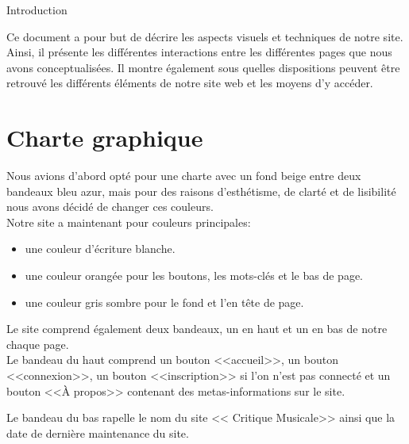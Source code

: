 
{Introduction}

	\begin{paragraphe}
		Ce document a pour but de décrire les aspects visuels et techniques de notre site.
		Ainsi, il présente les différentes interactions entre les différentes pages que nous avons conceptualisées.
		Il montre également sous quelles dispositions peuvent être retrouvé les différents éléments de notre site web et les moyens d'y accéder.
	\end{paragraphe}

\section{Charte graphique}

	\begin{paragraphe}
	    Nous avions d'abord opté pour une charte avec un fond beige entre deux bandeaux bleu azur, mais pour des raisons
	    d'esthétisme, de clarté et de lisibilité nous avons décidé de changer ces couleurs.\\

		Notre site a maintenant pour couleurs principales:
            \begin{itemize}
            \item une couleur d'écriture blanche.
            \item une couleur orangée pour les boutons, les mots-clés et le bas de page.
            \item une couleur gris sombre pour le fond et l'en tête de page.
            \end{itemize}

	\end{paragraphe}

    \begin{paragraphe}
		Le site comprend également deux bandeaux, un en haut et un en bas de notre chaque page.\\
		 Le bandeau du haut comprend un bouton <<accueil>>,
		un bouton <<connexion>>, un bouton <<inscription>> si l'on n'est pas connecté et un bouton <<À propos>> contenant des metas-informations sur le site.


        Le bandeau du bas rapelle le nom du site << Critique Musicale>> ainsi que la date de dernière maintenance du site.

	\end{paragraphe}

